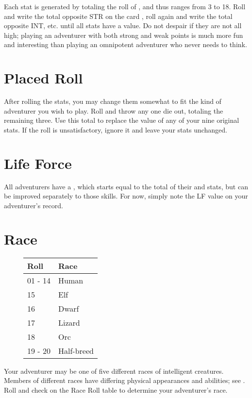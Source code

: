 \begin{multicols*}{2}
Each stat is generated by totaling the roll of , and thus ranges from 3 to 18. Roll  and write the total opposite STR on the card , roll again and write the total opposite INT, etc. until all stats have a value. Do not despair if they are not all high; playing an adventurer with both strong and weak points is much more fun and interesting than playing an omnipotent adventurer who never needs to think.
\section{Placed Roll}
After rolling the stats, you may change them somewhat to fit the kind of adventurer you wish to play. Roll  and throw any one die out, totaling the remaining three. Use this total to replace the value of any of your nine original stats. If the roll is unsatisfactory, ignore it and leave your stats unchanged.
\section{Life Force}
All adventurers have a , which starts equal to the total of their \HEA and \PER stats, but can be improved separately to those skills. For now, simply note the LF value on your adventurer's record.
\section{Race}
\begin{wrapfigure}[9]{l}[0pt]{85pt}
\begin{normbox}
\small
\begin{tabular}{@{}l l}
\textbf{Roll} & \textbf{Race}\\
\midrule
01 - 14 & Human\\
15 & Elf\\
16 & Dwarf \\
17 & Lizard\\
18 & Orc\\
19 - 20 & Half-breed
\end{tabular}
\end{normbox}\smallskip
\end{wrapfigure}
Your adventurer may be one of five different races of intelligent creatures. Members of different races have differing physical appearances and abilities; see . Roll  and check on the Race Roll table to determine your adventurer's race.


\end{multicols*}

